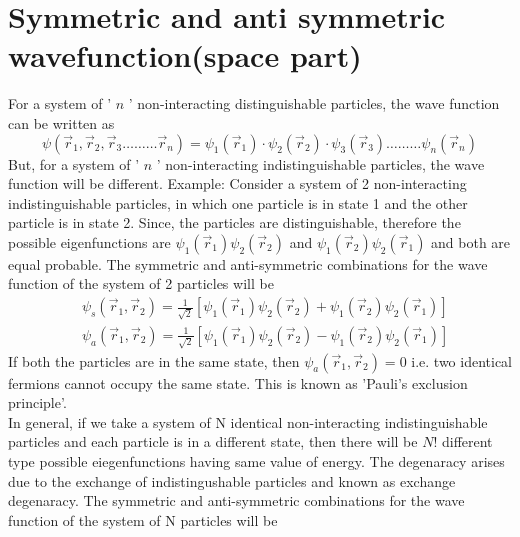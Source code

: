 \section{Symmetric and anti symmetric wavefunction(space part)}
For a system of ' $n$ ' non-interacting distinguishable particles, the wave function can be written as
$$
\psi\left(\vec{r}_{1}, \vec{r}_{2}, \vec{r}_{3} \ldots \ldots \ldots \vec{r}_{n}\right)=\psi_{1}\left(\vec{r}_{1}\right) \cdot \psi_{2}\left(\vec{r}_{2}\right) \cdot \psi_{3}\left(\vec{r}_{3}\right) \ldots \ldots \ldots \psi_{n}\left(\vec{r}_{n}\right)
$$
But, for a system of ' $n$ ' non-interacting indistinguishable particles, the wave function will be different.
Example:
Consider a system of 2 non-interacting indistinguishable particles, in which one particle is in state 1 and the other particle is in state 2. Since, the particles are distinguishable, therefore the possible eigenfunctions are $\psi_{1}\left(\vec{r}_{1}\right) \psi_{2}\left(\vec{r}_{2}\right)$ and $\psi_{1}\left(\vec{r}_{2}\right) \psi_{2}\left(\vec{r}_{1}\right)$ and both are equal probable. The symmetric and anti-symmetric combinations for the wave function of the system of 2 particles will be
$$
\begin{aligned}
&\psi_{s}\left(\vec{r}_{1}, \vec{r}_{2}\right)=\frac{1}{\sqrt{2}}\left[\psi_{1}\left(\vec{r}_{1}\right) \psi_{2}\left(\vec{r}_{2}\right)+\psi_{1}\left(\vec{r}_{2}\right) \psi_{2}\left(\vec{r}_{1}\right)\right] \\
&\psi_{a}\left(\vec{r}_{1}, \vec{r}_{2}\right)=\frac{1}{\sqrt{2}}\left[\psi_{1}\left(\vec{r}_{1}\right) \psi_{2}\left(\vec{r}_{2}\right)-\psi_{1}\left(\vec{r}_{2}\right) \psi_{2}\left(\vec{r}_{1}\right)\right]
\end{aligned}
$$
If both the particles are in the same state, then $\psi_{a}\left(\vec{r}_{1}, \vec{r}_{2}\right)=0$ i.e. two identical fermions cannot occupy the same state. This is known as 'Pauli's exclusion principle'.\\
In general, if we take a system of $\mathrm{N}$ identical non-interacting indistinguishable particles and each particle is in a different state, then there will be $N !$ different type possible eiegenfunctions having same value of energy. The degenaracy arises due to the exchange of indistingushable particles and known as exchange degenaracy. The symmetric and anti-symmetric combinations for the wave function of the system of $\mathrm{N}$ particles will be\\
